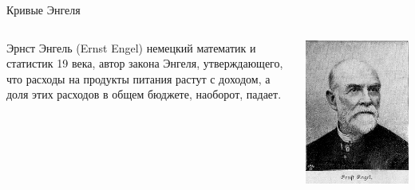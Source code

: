 \documentclass{beamer}
\begin{document}
\begin{frame}{Кривые Энгеля}

\begin{columns}
\begin{column}{0.5\textwidth}
   \alert{Эрнст Энгель} (Ernst Engel) немецкий математик и статистик 19 века, автор \alert{закона Энгеля}, утверждающего, что расходы на продукты питания растут с доходом, а доля этих расходов в общем бюджете, наоборот, падает. 
\end{column}
\begin{column}{0.5\textwidth}  %
    \begin{center}
     \includegraphics[width=1\textwidth]{engel.jpeg}
     \end{center}
\end{column}
\end{columns}

\end{frame}
\end{document}
